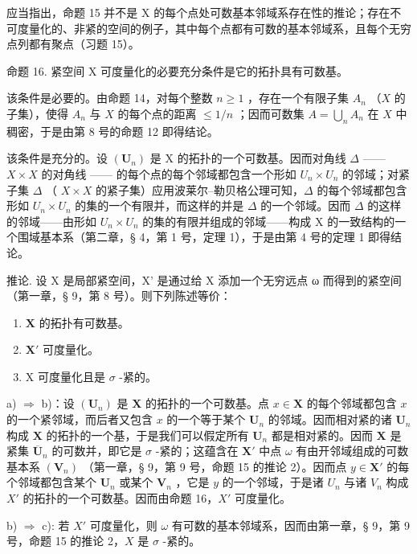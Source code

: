 应当指出，命题 15 并不是 X 的每个点处可数基本邻域系存在性的推论；存在不可度量化的、非紧的空间的例子，其中每个点都有可数的基本邻域系，且每个无穷点列都有聚点（习题 15）。

命题 16. 紧空间 X 可度量化的必要充分条件是它的拓扑具有可数基。

该条件是必要的。由命题 14，对每个整数 \(n \geqslant 1\) ，存在一个有限子集 \(A_n\) （\(X\) 的子集），使得 \(A_n\) 与 \(X\) 的每个点的距离 \(\leqslant 1/n\) ；因而可数集 \(A = \bigcup_{n} A_n\) 在 \(X\) 中稠密，于是由第 8 号的命题 12 即得结论。

该条件是充分的。设 \((\mathbf{U}_{n})\) 是 X 的拓扑的一个可数基。因而对角线 \(\Delta\) —— \(X \times X\) 的对角线 —— 的每个点的每个邻域都包含一个形如 \(U_{n} \times U_{n}\) 的邻域；对紧子集 \(\Delta\) （ \(X \times X\) 的紧子集）应用波莱尔–勒贝格公理可知，\(\Delta\) 的每个邻域都包含形如 \(U_{n} \times U_{n}\) 的集的一个有限并，而这样的并是 \(\Delta\) 的一个邻域。因而 \(\Delta\) 的这样的邻域——由形如 \(U_{n} \times U_{n}\) 的集的有限并组成的邻域——构成 X 的一致结构的一个围域基本系（第二章，§ 4，第 1 号，定理 1），于是由第 4 号的定理 1 即得结论。

推论. 设 X 是局部紧空间，X' 是通过给 X 添加一个无穷远点 ω 而得到的紧空间（第一章，§ 9，第 8 号）。则下列陈述等价：

\begin{enumerate}
\def\labelenumi{\alph{enumi})}
\item
  \(\mathbf{X}\) 的拓扑有可数基。
\item
  \(\mathbf{X}'\) 可度量化。
\item
  X 可度量化且是 \(\sigma\) -紧的。
\end{enumerate}

a) \(\Longrightarrow\) b)：设 \((\mathbf{U}_n)\) 是 \(\mathbf{X}\) 的拓扑的一个可数基。点 \(x \in \mathbf{X}\) 的每个邻域都包含 \(x\) 的一个紧邻域，而后者又包含 \(x\) 的一个等于某个 \(\mathbf{U}_n\) 的邻域。因而相对紧的诸 \(\mathbf{U}_n\) 构成 \(\mathbf{X}\) 的拓扑的一个基，于是我们可以假定所有 \(\mathbf{U}_n\) 都是相对紧的。因而 \(\mathbf{X}\) 是紧集 \(\overline{\mathbf{U}}_n\) 的可数并，即它是 \(\sigma\) -紧的；这蕴含在 \(\mathbf{X}'\) 中点 \(\omega\) 有由开邻域组成的可数基本系 \((\mathbf{V}_n)\) （第一章，§ 9，第 9 号，命题 15 的推论 2）。因而点 \(y \in \mathbf{X}'\) 的每个邻域都包含某个 \(\mathbf{U}_n\) 或某个 \(\mathbf{V}_n\) ，它是 \(y\) 的一个邻域，于是诸 \(U_{n}\) 与诸 \(V_{n}\) 构成 \(X'\) 的拓扑的一个可数基。因而由命题 16，\(X'\) 可度量化。

b) \(\Longrightarrow\) c): 若 \(X'\) 可度量化，则 \(\omega\) 有可数的基本邻域系，因而由第一章，§ 9，第 9 号，命题 15 的推论 2，\(X\) 是 \(\sigma\) -紧的。

